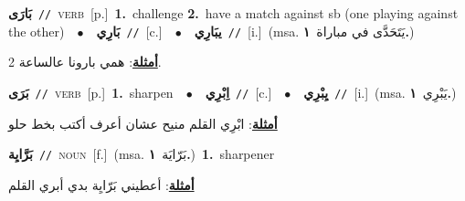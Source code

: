 \documentclass[10pt,a4paper,twoside]{article} %
\begin{document}
\begin{multicols}{2}
{\setlength\topsep{0pt}\textbf{\foreignlanguage{arabic}{بَارَى}}\ {\color{gray}\texttt{//}\color{black}}\ \textsc{verb}\ [p.]\ \textbf{1.}~challenge  \textbf{2.}~have a match against sb (one playing against the other)\ \ $\bullet$\ \ \setlength\topsep{0pt}\textbf{\foreignlanguage{arabic}{بَارِي}}\ {\color{gray}\texttt{//}\color{black}}\ [c.]\ \ $\bullet$\ \ \setlength\topsep{0pt}\textbf{\foreignlanguage{arabic}{يبَارِي}}\ {\color{gray}\texttt{//}\color{black}}\ [i.]\ \color{gray}(msa. \foreignlanguage{arabic}{يَتَحَدَّى في مباراة}~\foreignlanguage{arabic}{\textbf{١.}})\color{black}\  \begin{flushright}\color{gray}\foreignlanguage{arabic}{\textbf{\underline{\foreignlanguage{arabic}{أمثلة}}}: همي بارونا عالساعة 2.}\end{flushright}\color{black}} \vspace{2mm}

{\setlength\topsep{0pt}\textbf{\foreignlanguage{arabic}{بَرَى}}\ {\color{gray}\texttt{//}\color{black}}\ \textsc{verb}\ [p.]\ \textbf{1.}~sharpen\ \ $\bullet$\ \ \setlength\topsep{0pt}\textbf{\foreignlanguage{arabic}{اِبْرِي}}\ {\color{gray}\texttt{//}\color{black}}\ [c.]\ \ $\bullet$\ \ \setlength\topsep{0pt}\textbf{\foreignlanguage{arabic}{يِبْرِي}}\ {\color{gray}\texttt{//}\color{black}}\ [i.]\ \color{gray}(msa. \foreignlanguage{arabic}{يَبْرِي}~\foreignlanguage{arabic}{\textbf{١.}})\color{black}\  \begin{flushright}\color{gray}\foreignlanguage{arabic}{\textbf{\underline{\foreignlanguage{arabic}{أمثلة}}}: ابْرِي القلم منيح عشان أعرف أكتب بخط حلو}\end{flushright}\color{black}} \vspace{2mm}

{\setlength\topsep{0pt}\textbf{\foreignlanguage{arabic}{بَرَّايِة}}\ {\color{gray}\texttt{//}\color{black}}\ \textsc{noun}\ [f.]\ \color{gray}(msa. \foreignlanguage{arabic}{بَرّايَة}~\foreignlanguage{arabic}{\textbf{١.}})\color{black}\ \textbf{1.}~sharpener\  \begin{flushright}\color{gray}\foreignlanguage{arabic}{\textbf{\underline{\foreignlanguage{arabic}{أمثلة}}}: أعطيني بَرّايِة بدي أبري القلم}\end{flushright}\color{black}} \vspace{2mm}


\end{multicols}
\end{document}
